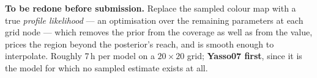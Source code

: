 \begin{provisional}
\textbf{To be redone before submission.} Replace the sampled colour map with a true \emph{profile
likelihood} --- an optimisation over the remaining parameters at each grid node --- which removes
the prior from the coverage as well as from the value, prices the region beyond the posterior's
reach, and is smooth enough to interpolate. Roughly 7\,h per model on a $20\times20$ grid;
\textbf{Yasso07 first}, since it is the model for which no sampled estimate exists at all.
\end{provisional}
